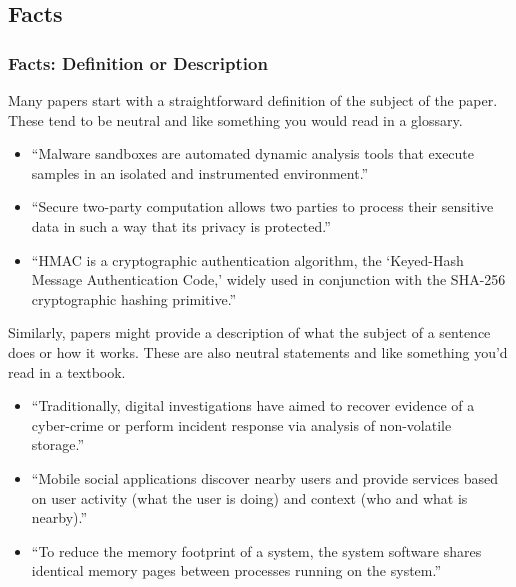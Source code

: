 \documentclass[sigconf,anonymous]{acmart}
\begin{document}
	
	\subsection{Facts}
	\subsubsection{Facts: Definition or Description}
	
	Many papers start with a straightforward definition of the subject of the paper. These tend to be neutral and like something you would read in a glossary.
	
	\begin{itemize}
		
		\item	``Malware sandboxes are automated dynamic analysis tools that execute samples in an isolated and instrumented environment.''~\cite{graziano2015needles}
		
		\item	``Secure two-party computation allows two parties to process their sensitive data in such a way that its privacy is protected.''~\cite{demmler2014}
		
		\item	``HMAC is a cryptographic authentication algorithm, the ‘Keyed-Hash Message Authentication Code,’ widely used in conjunction with the SHA-256 cryptographic hashing primitive.''~\cite{beringer2015verified}
		
	\end{itemize} 
	
	Similarly, papers might provide a description of what the subject of a sentence does or how it works. These are also neutral statements and like something you’d read in a textbook. 
	
	\begin{itemize}
		
		\item	``Traditionally, digital investigations have aimed to recover evidence of a cyber-crime or perform incident response via analysis of non-volatile storage.''~\cite{saltaformaggio2014dscrete}
		
		\item	``Mobile social applications discover nearby users and provide services based on user activity (what the user is doing) and context (who and what is nearby).''~\cite{lentz2014sddr}
		
		\item	``To reduce the memory footprint of a system, the system software shares identical memory pages between processes running on the system.''~\cite{yarom2014flush+}
	\end{itemize} 	
\end{document}
